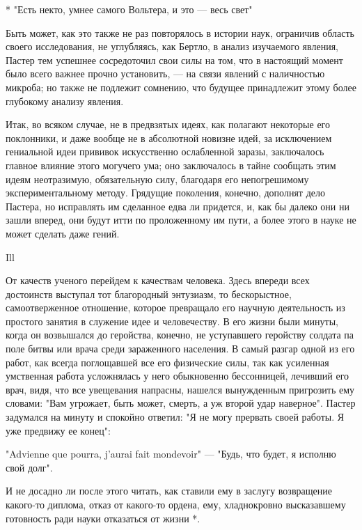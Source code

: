 * "Есть некто, умнее самого Вольтера, и это --- весь свет"

Быть может, как это также не  раз повторялось в истории наук,  ограничив
область  своего  исследования,  не  углубляясь,  как  Бертло,  в  анализ
изучаемого явления, Пастер тем успешнее  сосредоточил свои силы на  том,
что в настоящий момент было всего  важнее прочно установить, --- на  связи
явлений с  наличностью  микроба;  но также  не  подлежит  сомнению,  что
будущее принадлежит этому более глубокому анализу явления.

Итак, во всяком случае,  не в предвзятых  идеях, как полагают  некоторые
его  поклонники,  и  даже  вообще  не  в  абсолютной  новизне  идей,  за
исключением гениальной  идеи прививок  искусственно ослабленной  заразы,
заключалось главное влияние этого могучего ума; оно заключалось в  тайне
сообщать  этим  идеям  неотразимую,  обязательную  силу,  благодаря  его
непогрешимому экспериментальному  методу. Грядущие  поколения,  конечно,
дополнят дело Пастера, но исправлять  им сделанное едва ли придется,  и,
как бы далеко  они ни зашли  вперед, они будут  итти по проложенному  им
пути, а более этого в науке не может сделать даже гений.

Ill

От качеств ученого  перейдем к  качествам человека.  Здесь впереди  всех
достоинств  выступал   тот  благородный   энтузиазм,  то   бескорыстное,
самоотверженное отношение, которое  превращало его научную  деятельность
из простого занятия  в служение идее  и человечеству. В  его жизни  были
минуты, когда  он  возвышался  до  геройства,  конечно,  не  уступавшего
геройству солдата па поле битвы или врача среди зараженного населения. В
самый разгар  одной  из  его  работ,  как  всегда  поглощавшей  все  его
физические силы, так как усиленная умственная работа усложнялась у  него
обыкновенно бессонницей,  лечивший его  врач, видя,  что все  увещевания
напрасны, нашелся  вынужденным пригрозить  ему словами:  "Вам  угрожает,
быть может,  смерть, а  уж второй  удар наверное".  Пастер задумался  на
минуту и  спокойно ответил:  "Я не  могу прервать  своей работы.  Я  уже
предвижу ее конец":

"Advienne que pourra, j'aurai fait mondevoir" --- "Будь, что будет, я
исполню свой долг".

И  не  досадно  ли  после  этого  читать,  как  ставили  ему  в  заслугу
возвращение  какого-то  диплома,   отказ  от   какого-то  ордена,   ему,
хладнокровно высказавшему готовность ради науки отказаться от жизни *.

